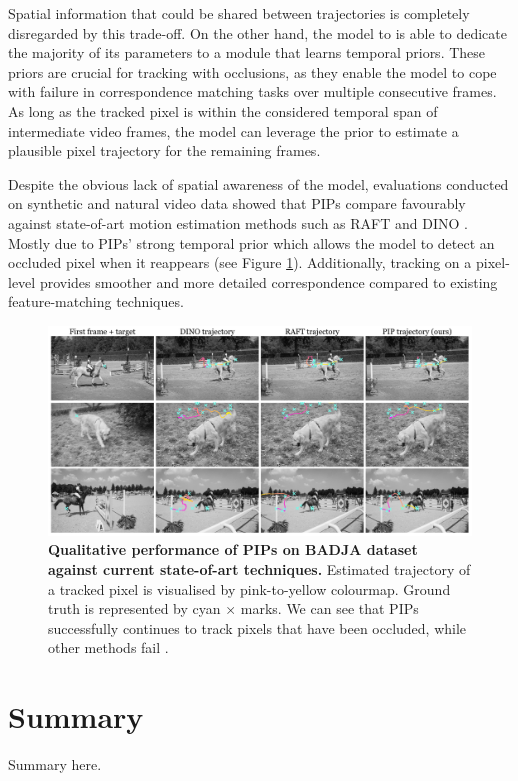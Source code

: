 \documentclass{l4proj}
\begin{document}
Spatial information that could be shared between trajectories is completely disregarded by this trade-off. On the other hand, the model to is able to dedicate the majority of its parameters to a module that learns temporal priors. These priors are crucial for tracking with occlusions, as they enable the model to cope with failure in correspondence matching tasks over multiple consecutive frames. As long as the tracked pixel is within the considered temporal span of intermediate video frames, the model can leverage the prior to estimate a plausible pixel trajectory for the remaining frames.

Despite the obvious lack of spatial awareness of the model, evaluations conducted on synthetic and natural video data showed that PIPs compare favourably against state-of-art motion estimation methods such as RAFT \citep{DBLP:journals/corr/abs-2003-12039} and DINO \citep{DINO21}. Mostly due to PIPs' strong temporal prior which allows the model to detect an occluded pixel when it reappears (see Figure \ref{fig:pips}). Additionally, tracking on a pixel-level provides smoother and more detailed correspondence compared to existing feature-matching techniques. 

\begin{figure}
    \centering
    \includegraphics[width=0.85\linewidth]{images/PIPs_performance.png}    
    \caption{\textbf{Qualitative performance of PIPs on BADJA dataset against current state-of-art techniques.} Estimated trajectory of a tracked pixel is visualised by pink-to-yellow colourmap. Ground truth is represented by cyan × marks. We can see that PIPs successfully continues to track pixels that have been occluded, while other methods fail \citep{DBLP:journals/corr/abs-2204-04153}.}
    \label{fig:pips} 
\end{figure}

\section{Summary}
Summary here.
\end{document}
